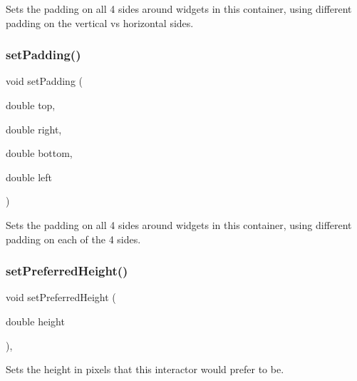 Sets the padding on all 4 sides around widgets in this container, using different padding on the vertical vs horizontal sides. 

\mbox{\label{classsgl_1_1GContainer_a9adbf36914b59c2ed3ed9aebe7adfc7e}} 
\subsubsection{\texorpdfstring{set\+Padding()}{setPadding()}\hspace{0.1cm}{\footnotesize\ttfamily [3/3]}}
{\footnotesize\ttfamily void set\+Padding (\begin{DoxyParamCaption}\item[{double}]{top,  }\item[{double}]{right,  }\item[{double}]{bottom,  }\item[{double}]{left }\end{DoxyParamCaption})\hspace{0.3cm}{\ttfamily [virtual]}}



Sets the padding on all 4 sides around widgets in this container, using different padding on each of the 4 sides. 

\mbox{\label{classsgl_1_1GInteractor_a1ab987704fce32098706c6f00fb08218}} 
\subsubsection{\texorpdfstring{set\+Preferred\+Height()}{setPreferredHeight()}}
{\footnotesize\ttfamily void set\+Preferred\+Height (\begin{DoxyParamCaption}\item[{double}]{height }\end{DoxyParamCaption})\hspace{0.3cm}{\ttfamily [virtual]}, {\ttfamily [inherited]}}



Sets the height in pixels that this interactor would prefer to be. 

